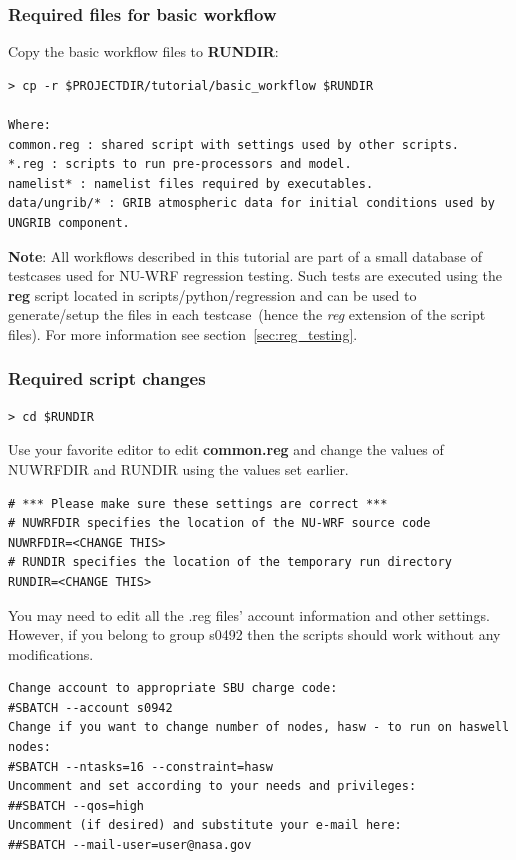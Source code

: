 \begin{frame}[fragile]\frametitle{Required files for basic workflow}

Copy the basic workflow files to \textbf{RUNDIR}:
\begin{lstlisting}
> cp -r $PROJECTDIR/tutorial/basic_workflow $RUNDIR

Where:
common.reg : shared script with settings used by other scripts.
*.reg : scripts to run pre-processors and model.
namelist* : namelist files required by executables.
data/ungrib/* : GRIB atmospheric data for initial conditions used by UNGRIB component.
\end{lstlisting}

\textbf{Note}: All workflows described in this tutorial are part of a small database of testcases used for NU-WRF regression testing.  Such tests are executed using the \textbf{reg} script located in scripts/python/regression and can be used to generate/setup the files in each testcase~(hence the \emph{reg} extension of the script files). For more information see section~\ref{sec:reg_testing}.

\end{frame}

\begin{frame}[fragile]
\frametitle{Required script changes}
\verbatimfont{\scriptsize}%
\begin{verbatim}
> cd $RUNDIR
\end{verbatim}
 Use your favorite editor to edit \textbf{common.reg} and change the values of NUWRFDIR and RUNDIR using the values set earlier.
\verbatimfont{\scriptsize}%
\begin{verbatim}
# *** Please make sure these settings are correct ***
# NUWRFDIR specifies the location of the NU-WRF source code
NUWRFDIR=<CHANGE THIS>
# RUNDIR specifies the location of the temporary run directory
RUNDIR=<CHANGE THIS>
\end{verbatim}
You may need to edit all the .reg files' account information and other settings. However, if you belong to group s0492 then the scripts should work without any modifications.
\verbatimfont{\scriptsize}%
\begin{verbatim}
Change account to appropriate SBU charge code:
#SBATCH --account s0942 
Change if you want to change number of nodes, hasw - to run on haswell nodes:
#SBATCH --ntasks=16 --constraint=hasw
Uncomment and set according to your needs and privileges:
##SBATCH --qos=high 
Uncomment (if desired) and substitute your e-mail here:
##SBATCH --mail-user=user@nasa.gov 
\end{verbatim}

\end{frame}

